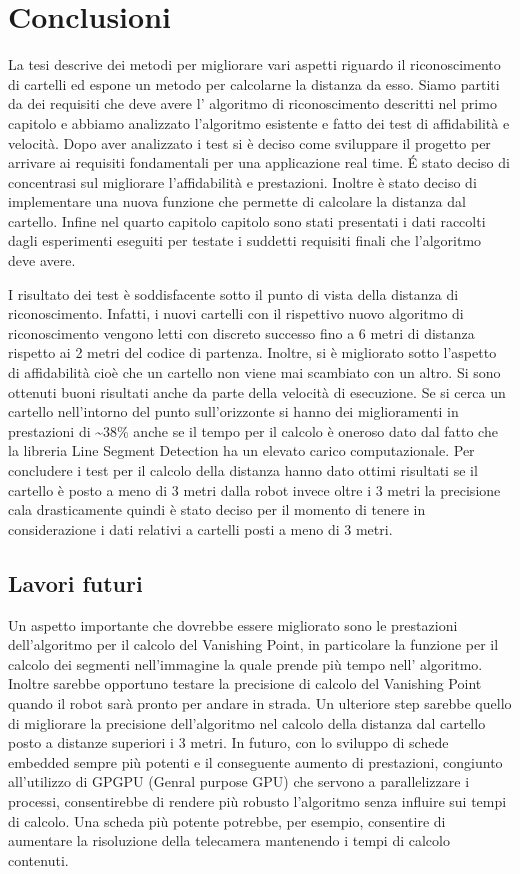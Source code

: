 
\chapter{Conclusioni}

	La tesi descrive dei metodi per migliorare vari aspetti riguardo il riconoscimento di cartelli ed espone un metodo per calcolarne la distanza da esso. Siamo partiti da dei requisiti che deve avere l' algoritmo di riconoscimento descritti nel primo capitolo e abbiamo analizzato l'algoritmo esistente e fatto dei test di affidabilità e velocità. Dopo aver analizzato i test si è deciso come sviluppare il progetto per arrivare ai requisiti fondamentali per una applicazione real time. \'E stato deciso di concentrasi sul migliorare l'affidabilità e prestazioni. Inoltre è stato deciso di implementare una nuova funzione che permette di calcolare la distanza dal cartello. Infine nel quarto capitolo capitolo sono stati presentati i dati raccolti dagli esperimenti eseguiti per testate i suddetti requisiti finali che l'algoritmo deve avere.

	I risultato dei test è soddisfacente sotto il punto di vista della distanza di riconoscimento. Infatti, i nuovi cartelli con il rispettivo nuovo algoritmo di riconoscimento vengono letti con discreto successo fino a 6 metri di distanza rispetto ai 2 metri del codice di partenza. Inoltre, si è migliorato sotto l'aspetto di affidabilità cioè che un cartello non viene mai scambiato con un altro. Si sono ottenuti buoni risultati anche da parte della velocità di esecuzione. Se si cerca un cartello nell'intorno del punto sull'orizzonte si hanno dei miglioramenti in prestazioni di \textasciitilde $38$\% anche se il tempo per il calcolo è oneroso dato dal fatto che la libreria Line Segment Detection ha un elevato carico computazionale. Per concludere i test per il calcolo della distanza hanno dato ottimi risultati se il cartello è posto a meno di 3 metri dalla robot invece oltre i 3 metri la precisione cala drasticamente quindi è stato deciso per il momento di tenere in considerazione i dati relativi a cartelli posti a meno di 3 metri.

\section{Lavori futuri}

	Un aspetto importante che dovrebbe essere migliorato sono le prestazioni dell'algoritmo per il calcolo del Vanishing Point, in particolare la funzione per il calcolo dei segmenti nell'immagine la quale prende più tempo nell' algoritmo. Inoltre sarebbe opportuno testare la precisione di calcolo del Vanishing Point quando il robot sarà pronto per andare in strada. Un ulteriore step sarebbe quello di migliorare la precisione dell'algoritmo nel calcolo della distanza dal cartello posto a distanze superiori i 3 metri. In futuro, con lo sviluppo di schede embedded sempre più potenti e il conseguente aumento di prestazioni, congiunto all'utilizzo di GPGPU (Genral purpose GPU) che servono a parallelizzare i processi, consentirebbe di rendere più robusto l'algoritmo senza influire sui tempi di calcolo. Una scheda più potente potrebbe, per esempio, consentire di aumentare la risoluzione della telecamera mantenendo i tempi di calcolo contenuti.